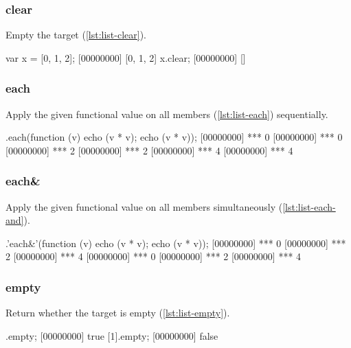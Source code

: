 \subsubsection{clear}

Empty the target (\autoref{lst:list-clear}).

\begin{urbiscript}[caption=List.clear, label=lst:list-clear, float=\floatposh]
  var x = [0, 1, 2];
  [00000000] [0, 1, 2]
  x.clear;
  [00000000] []
\end{urbiscript}

\subsubsection{each}

Apply the given functional value on all members (\autoref{lst:list-each})
sequentially.

\begin{urbiscript}[caption=List.each, label=lst:list-each, float=\floatposh]
  [0, 1, 2].each(function (v) {echo (v * v); echo (v * v)});
  [00000000] *** 0
  [00000000] *** 0
  [00000000] *** 2
  [00000000] *** 2
  [00000000] *** 4
  [00000000] *** 4
\end{urbiscript}

\subsubsection{each\&}

Apply the given functional value on all members simultaneously
(\autoref{lst:list-each-and}).

\begin{urbiscript}[caption=List.each, label=lst:list-each-and, float=\floatposh]
  [0, 1, 2].'each&'(function (v) {echo (v * v); echo (v * v)});
  [00000000] *** 0
  [00000000] *** 2
  [00000000] *** 4
  [00000000] *** 0
  [00000000] *** 2
  [00000000] *** 4
\end{urbiscript}

\subsubsection{empty}

Return whether the target is empty (\autoref{lst:list-empty}).

\begin{urbiscript}[caption=List.empty, label=lst:list-empty, float=\floatposh]
  [].empty;
  [00000000] true
  [1].empty;
  [00000000] false
\end{urbiscript}


